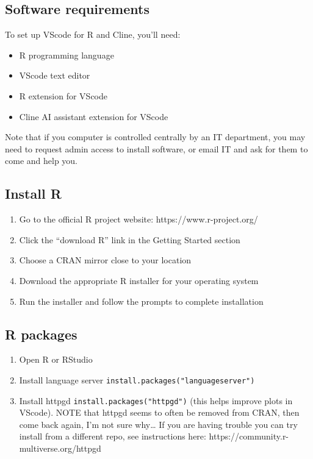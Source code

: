 \documentclass[
  letterpaper,
  DIV=11,
  numbers=noendperiod]{scrreprt}
\providecommand{\tightlist}{%
  \setlength{\itemsep}{0pt}\setlength{\parskip}{0pt}}\usepackage{longtable,booktabs,array}
\begin{document}
\subsection{Software requirements}\label{software-requirements}

To set up VScode for R and Cline, you'll need:

\begin{itemize}
\tightlist
\item
  R programming language
\item
  VScode text editor
\item
  R extension for VScode
\item
  Cline AI assistant extension for VScode
\end{itemize}

Note that if you computer is controlled centrally by an IT department,
you may need to request admin access to install software, or email IT
and ask for them to come and help you.

\subsection{Install R}\label{install-r}

\begin{enumerate}
\def\labelenumi{\arabic{enumi}.}
\tightlist
\item
  Go to the official R project website: https://www.r-project.org/
\item
  Click the ``download R'' link in the Getting Started section
\item
  Choose a CRAN mirror close to your location
\item
  Download the appropriate R installer for your operating system
\item
  Run the installer and follow the prompts to complete installation
\end{enumerate}

\subsection{R packages}\label{r-packages-1}

\begin{enumerate}
\def\labelenumi{\arabic{enumi}.}
\tightlist
\item
  Open R or RStudio
\item
  Install language server \texttt{install.packages("languageserver")}
\item
  Install httpgd \texttt{install.packages("httpgd")} (this helps improve
  plots in VScode). NOTE that httpgd seems to often be removed from
  CRAN, then come back again, I'm not sure why\ldots{} If you are having
  trouble you can try install from a different repo, see instructions
  here: https://community.r-multiverse.org/httpgd
\end{enumerate}
\end{document}
